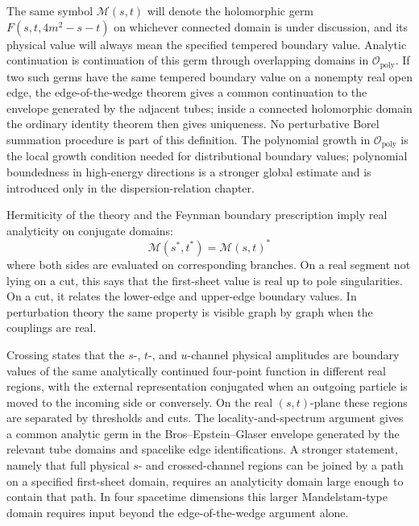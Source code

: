 The same symbol \(\mathcal M(s,t)\) will denote the holomorphic germ
\(F(s,t,4m^2-s-t)\) on whichever connected domain is under discussion, and
its physical value will always mean the specified tempered boundary value.
Analytic continuation is continuation of this germ through overlapping
domains in \(\mathcal O_{\mathrm{poly}}\).  If two such germs have the same
tempered boundary value on a nonempty real open edge, the edge-of-the-wedge
theorem gives a common continuation to the envelope generated by the adjacent
tubes; inside a connected holomorphic domain the ordinary identity theorem
then gives uniqueness.  No perturbative Borel summation procedure is part of
this definition.  The polynomial growth in
\(\mathcal O_{\mathrm{poly}}\) is the local growth condition needed for
distributional boundary values; polynomial boundedness in high-energy
directions is a stronger global estimate and is introduced only in the
dispersion-relation chapter.

Hermiticity of the theory and the Feynman boundary prescription imply real
analyticity on conjugate domains:
\[
  \mathcal M(s^*,t^*)=\mathcal M(s,t)^*
\]
where both sides are evaluated on corresponding branches.  On a real segment
not lying on a cut, this says that the first-sheet value is real up to pole
singularities.  On a cut, it relates the lower-edge and upper-edge boundary
values.  In perturbation theory the same property is visible graph by graph
when the couplings are real.

Crossing states that the \(s\)-, \(t\)-, and \(u\)-channel physical amplitudes
are boundary values of the same analytically continued four-point function in
different real regions, with the external representation conjugated when an
outgoing particle is moved to the incoming side or conversely.  On the real
\((s,t)\)-plane these regions are separated by thresholds and cuts.  The
locality-and-spectrum argument gives a common analytic germ in the
Bros--Epstein--Glaser envelope generated by the relevant tube domains and
spacelike edge identifications.  A stronger statement, namely that full
physical \(s\)- and crossed-channel regions can be joined by a path on a
specified first-sheet domain, requires an analyticity domain large enough to
contain that path.  In four spacetime dimensions this larger Mandelstam-type
domain requires input beyond the edge-of-the-wedge argument alone.

